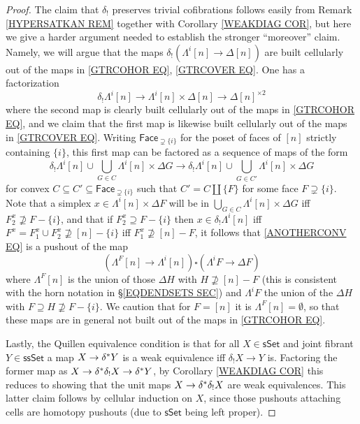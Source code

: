 \documentclass[a4paper,10pt
 ,draft
]{article}%
\begin{document}
\begin{proof}
The claim that $\delta_!$ preserves trivial cofibrations follows easily from Remark \ref{HYPERSATKAN REM} together with Corollary \ref{WEAKDIAG COR}, but here we give a harder argument needed to establish the stronger ``moreover'' claim.
Namely, we will argue that the maps
$\delta_! \left( \Lambda^i[n] \to \Delta[n]\right)$
are built cellularly out of the maps in 
\eqref{GTRCOHOR EQ}, \eqref{GTRCOVER EQ}.
One has a factorization
\[
	\delta_! \Lambda^i[n] \to
	\Lambda^i[n] \times \Delta[n] \to \Delta[n]^{\times 2}
\]
where the second map is clearly built cellularly out of the maps in 
\eqref{GTRCOHOR EQ}, and we claim that 
the first map is likewise built cellularly out of the maps in \eqref{GTRCOVER EQ}.
Writing $\mathsf{Face}_{\supsetneq \{i\}}$ for the poset
of faces of $[n]$ strictly containing $\{i\}$, this first map 
can be factored as a sequence of maps of the form
\begin{equation}\label{ANOTHERCONV EQ}
\delta_! \Lambda^i[n] \cup \bigcup_{G \in C} \Lambda^i[n] \times \Delta G
\to
\delta_! \Lambda^i[n] \cup \bigcup_{G \in C'} \Lambda^i[n] \times \Delta G
\end{equation}
for convex
$C \subseteq C' \subseteq \mathsf{Face}_{\supsetneq \{i\}}$ such that $C' = C \amalg \{F\}$ for some face $F\supsetneq \{i\}$.
Note that a simplex 
$x \in \Lambda^i[n] \times \Delta F$
will be in $\bigcup_{G \in C} \Lambda^i[n] \times \Delta G$ iff 
$F_2^x \not \supseteq F-\{i\}$, 
and that if 
$F_2^x \supseteq F-\{i\}$
then $x \in \delta_! \Lambda^i[n]$ 
iff $F^x=F_1^x \cup F_2^x \not \supseteq [n] - \{i\}$
iff $F_1^x \not \supseteq [n] - F$,
it follows that \eqref{ANOTHERCONV EQ} is a pushout of the map
\begin{equation}\label{LAMBDAFPUSH EQ}
	\left(\Lambda^{F}[n] \to \Lambda^i[n] \right)
		\square
	\left(\Lambda^{i}F \to \Delta F \right)
\end{equation}
where $\Lambda^{F}[n]$ is the union of those $\Delta H$ with $H \not \supseteq [n] - F$ (this is consistent with the horn notation in \S \ref{EQDENDSETS SEC})
and $\Lambda^i F$ the union of the $\Delta H$ with $F \supseteq H \not \supseteq F - \{i\}$.
We caution that for $F=[n]$ it is $\Lambda^F[n]=\emptyset$, so that these maps are in general not built out of the maps in \eqref{GTRCOHOR EQ}. 


Lastly, the Quillen equivalence condition 
is that for all $X \in \mathsf{sSet}$ and joint fibrant
$Y \in \mathsf{ssSet}$ a map
$X \to \delta^{\**} Y$ is a weak equivalence iff 
$\delta_!X \to Y$ is. Factoring the former map as
$X \to \delta^{\**} \delta_! X \to \delta^{\**} Y$,
by Corollary \ref{WEAKDIAG COR}
this reduces to showing
that the unit maps $X \to \delta^{\**} \delta_! X$
are weak equivalences. This latter claim follows by cellular induction on $X$, since those pushouts attaching cells are homotopy pushouts (due to $\mathsf{sSet}$ being left proper).
\end{proof}
\end{document}
